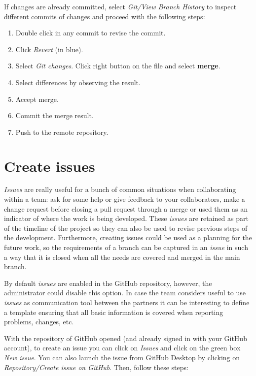 If changes are already committed, select   \textit{Git/View Branch History}
to inspect different commits of changes and proceed with the following steps: 
\begin{enumerate}
 \setlength\itemsep{0.0cm}
\item Double click in any commit to revise the commit.
\item Click \textit{Revert} (in blue). 
\item Select \textit{Git changes}.  Click right button on the file and select {\bf merge}.
\item Select differences by observing the result. 
\item Accept merge. 
\item Commit the merge result. 
\item Push to the remote repository. 
\end{enumerate} 



\section{Create issues}

\textit{Issues} are really useful for a bunch of common situations when collaborating within a team: ask for some help or give feedback to your collaborators, make a change request before closing a pull request through a merge or used them as an indicator of where the work is being developed. These \textit{issues} are retained as part of the timeline of the project so they can also be used to revise previous steps of the development. Furthermore, creating issues could be used as a planning for the future work, so the requirements of a branch can be captured in an \textit{issue} in such a way that it is closed when all the needs are covered and merged in the main branch. 

By default \textit{issues} are enabled in the GitHub repository, however, the administrator could disable this option. 
In case the team considers useful to use \textit{issues} as communication tool between the partners it can be interesting 
to define a template ensuring that all basic information is covered when reporting problems, changes, etc.

With the repository of GitHub opened (and already signed in with your GitHub account), to create an issue you can click on \textit{Issues} and click on the green box \textit{New issue}. 
You can also launch the issue from GitHub Desktop by clicking on \textit{Repository/Create issue on GitHub}. Then, follow these steps:


